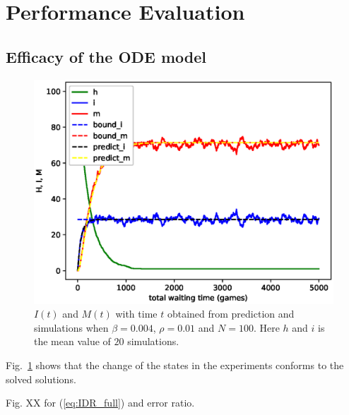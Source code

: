 \section{Performance Evaluation}
\subsection{Efficacy of the ODE model}
\label{subsec:pe_valid}
\begin{figure}
  \includegraphics[width=.45\textwidth]{fig/twohop_predict_sim.eps}
  \caption{$I(t)$ and $M(t)$ with time $t$ obtained from prediction and simulations
  when $\beta = 0.004$, $\rho = 0.01$ and $N=100$. Here $h$ and $i$ is the mean value of $20$ simulations.}
  \label{fig:twohop_predict_wod}
\end{figure}
Fig.~\ref{fig:twohop_predict_wod} shows that the change of the states
in the experiments conforms to
the solved solutions.

Fig. XX
for (\ref{eq:IDR_full}) and error ratio.

